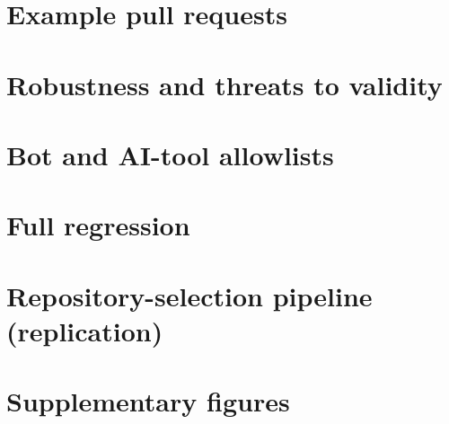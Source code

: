\documentclass{article}
\begin{document}
\newpage\appendix
\onecolumn
\section{Example pull requests}
\label{app:examples}


\section{Robustness and threats to validity}
\label{app:threats}


\section{Bot and AI-tool allowlists}
\label{app:allowlist}


\section{Full regression}
\label{app:reg}


\section{Repository-selection pipeline (replication)}
\label{app:repo-selection}


\section{Supplementary figures}
\label{app:extra-figures}

\end{document}
